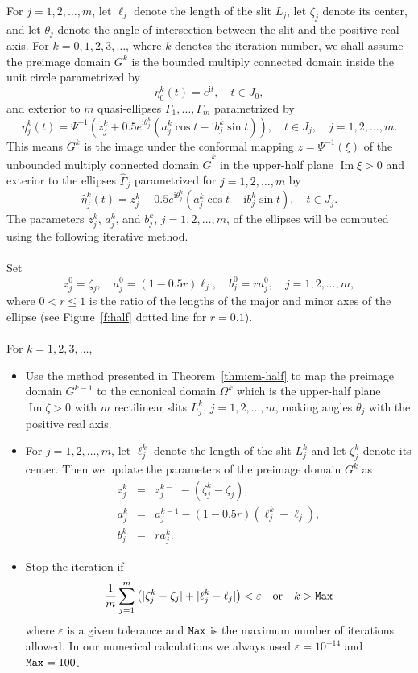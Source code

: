 \documentclass[11pt,a4paper]{article}
\renewcommand{\Im}{\mathop{\mathrm{Im}}}
\renewcommand{\i}{\mathrm{i}}
\renewcommand{\Im}{\mathop{\mathrm{Im}}}
\renewcommand{\i}{\mathrm{i}}
\begin{document}
For $j=1,2,\ldots,m$, let $\ell_j$ denote the length of the slit $L_j$, let $\zeta_j$ denote its center, and let $\theta_j$ denote the angle of intersection between the slit and the positive real axis. 
For $k=0,1,2,3,\ldots$, where $k$ denotes the iteration number, we shall assume the preimage domain $G^k$ is the bounded multiply connected domain inside the unit circle parametrized by
\[
\eta^k_0(t)=e^{\i t}, \quad  t\in J_0,
\]
and exterior to $m$ quasi-ellipses $\Gamma_1,\ldots,\Gamma_m$ parametrized by
\[
\eta^k_j(t)=\Psi^{-1}\left(z^k_j+0.5e^{\i\theta^k_j}(a^k_j\cos t-\i b^k_j\sin t)\right), \quad t\in J_j, \quad j=1,2,\ldots,m.
\]
This means $G^k$ is the image under the conformal mapping $z=\Psi^{-1}(\xi)$ of the unbounded multiply connected domain $\hat G^k$ in the upper-half plane $\Im\xi>0$ and exterior to the ellipses $\hat\Gamma_j$ parametrized for $j=1,2,\ldots,m$ by
\[
\hat\eta^k_j(t)=z^k_j+0.5e^{\i\theta^k_j}(a^k_j\cos t-\i b^k_j\sin t), \quad t\in J_j.
\]
The parameters $z^k_j$, $a^k_j$, and $b^k_j$, $j=1,2,\ldots,m$, of the ellipses will be computed using the following iterative method.\\
\\
Set
\[
z^0_j=\zeta_j, \quad a^0_j=(1-0.5r)\ell_j, \quad b^0_j=r a^0_j, \quad j=1,2,\ldots,m,
\]
where $0<r\le1$ is the ratio of the lengths of the major and minor axes of the ellipse (see Figure~\ref{f:half} dotted line for $r=0.1$). \\
 \\
For $k=1,2,3,\ldots$,
\begin{itemize}
	\item Use the method presented in Theorem~\ref{thm:cm-half} to map the preimage domain $G^{k-1}$ to the canonical domain $\Omega^k$ which is the upper-half plane $\Im\zeta>0$ with $m$ rectilinear slits $L^k_j$, $j=1,2,\ldots,m$, making angles $\theta_j$ with the positive real axis.
	\item For $j=1,2,\ldots,m$, let $\ell^k_j$ denote the length of the slit $L^k_j$ and let $\zeta^k_j$ denote its center. Then we update the parameters of the preimage domain $G^k$ as
\begin{eqnarray}
\label{eq:half-k}
z^{k}_j &=& z^{k-1}_j-(\zeta^{k}_j-\zeta_j), \\
a^{k}_j &=& a^{k-1}_j-(1-0.5r)(\ell^{k}_j -\ell_j), \\
b^{k}_j &=& r a^{k}_j.
\end{eqnarray}
  \item Stop the iteration if 
	\[
	\frac{1}{m}\sum_{j=1}^{m}\left(|\zeta^{k}_j -\zeta_j|+|\ell^{k}_j -\ell_j|\right)<\varepsilon \quad{\rm or}\quad k>{\tt Max}
	\]
	where $\varepsilon$ is a given tolerance and ${\tt Max}$ is the maximum number of iterations allowed. In our
numerical calculations we always used $\varepsilon=10^{-14}$ and ${\tt Max}=100$.
\end{itemize}
 
\end{document}
